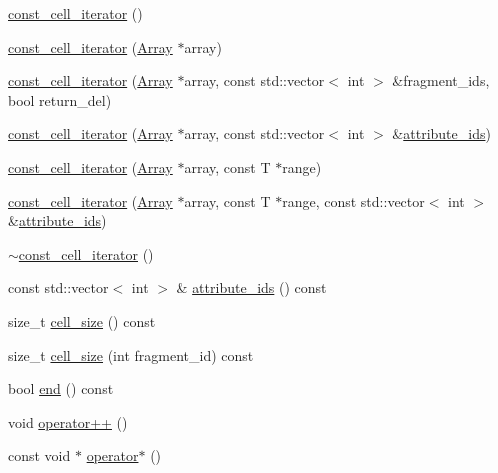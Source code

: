 \begin{DoxyCompactItemize}
\item 
\hyperlink{classStorageManager_1_1Array_1_1const__cell__iterator_ad3972331020ec6e28ca9fa30a5fc8870}{const\+\_\+cell\+\_\+iterator} ()
\item 
\hyperlink{classStorageManager_1_1Array_1_1const__cell__iterator_aeff330c716b3fe4902bd3351b110919d}{const\+\_\+cell\+\_\+iterator} (\hyperlink{classStorageManager_1_1Array}{Array} $\ast$array)
\item 
\hyperlink{classStorageManager_1_1Array_1_1const__cell__iterator_aafb0e76701f077916a65fae9616e18c7}{const\+\_\+cell\+\_\+iterator} (\hyperlink{classStorageManager_1_1Array}{Array} $\ast$array, const std\+::vector$<$ int $>$ \&fragment\+\_\+ids, bool return\+\_\+del)
\item 
\hyperlink{classStorageManager_1_1Array_1_1const__cell__iterator_a612873dd9b21b1e1014a00ff0da744b2}{const\+\_\+cell\+\_\+iterator} (\hyperlink{classStorageManager_1_1Array}{Array} $\ast$array, const std\+::vector$<$ int $>$ \&\hyperlink{classStorageManager_1_1Array_1_1const__cell__iterator_a71aaf02a3b07cb88ad1c3e6266c84e7a}{attribute\+\_\+ids})
\item 
\hyperlink{classStorageManager_1_1Array_1_1const__cell__iterator_a58440631f6d1a4917a69ad3bd1709d15}{const\+\_\+cell\+\_\+iterator} (\hyperlink{classStorageManager_1_1Array}{Array} $\ast$array, const T $\ast$range)
\item 
\hyperlink{classStorageManager_1_1Array_1_1const__cell__iterator_a25bcfbc84d715cf407a5469d02fdd4f9}{const\+\_\+cell\+\_\+iterator} (\hyperlink{classStorageManager_1_1Array}{Array} $\ast$array, const T $\ast$range, const std\+::vector$<$ int $>$ \&\hyperlink{classStorageManager_1_1Array_1_1const__cell__iterator_a71aaf02a3b07cb88ad1c3e6266c84e7a}{attribute\+\_\+ids})
\item 
\hyperlink{classStorageManager_1_1Array_1_1const__cell__iterator_af0c884616e08ada447b2d19a5eb31d0e}{$\sim$const\+\_\+cell\+\_\+iterator} ()
\item 
const std\+::vector$<$ int $>$ \& \hyperlink{classStorageManager_1_1Array_1_1const__cell__iterator_a71aaf02a3b07cb88ad1c3e6266c84e7a}{attribute\+\_\+ids} () const 
\item 
size\+\_\+t \hyperlink{classStorageManager_1_1Array_1_1const__cell__iterator_a88afef2fea17c3a215327141d3d3f2e2}{cell\+\_\+size} () const 
\item 
size\+\_\+t \hyperlink{classStorageManager_1_1Array_1_1const__cell__iterator_a679b340a3ec7d27e70875cefe984244b}{cell\+\_\+size} (int fragment\+\_\+id) const 
\item 
bool \hyperlink{classStorageManager_1_1Array_1_1const__cell__iterator_a21cfaee2f5e969487eaf0e56921a85f2}{end} () const 
\item 
void \hyperlink{classStorageManager_1_1Array_1_1const__cell__iterator_adc14300a8e57edb1f47d750e073acf2b}{operator++} ()
\item 
const void $\ast$ \hyperlink{classStorageManager_1_1Array_1_1const__cell__iterator_a226800f1fe18a99e809f1c4948dac651}{operator$\ast$} ()
\end{DoxyCompactItemize}
